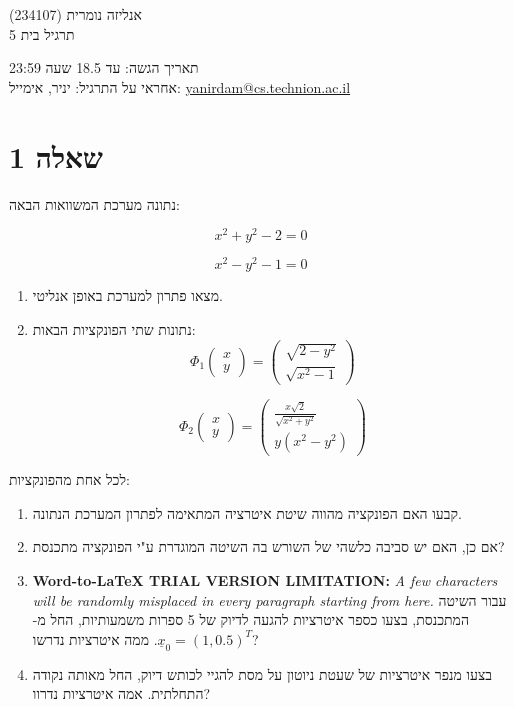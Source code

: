 \documentclass[10pt]{article}
\author{Yanir Damti}
\title{}
\begin{document}
\begin{center}
{\Huge אנליזה נומרית (234107)
\\
תרגיל בית 5}
\end{center}

\begin{center}
{\LARGE תאריך הגשה: עד 18.5 שעה 23:59
\\
אחראי על התרגיל: יניר, אימייל: \uline{yanirdam@cs.technion.ac.il}}
\end{center}

{\raggedleft
\section{שאלה 1}
}

{\raggedleft
{\large נתונה מערכת המשוואות הבאה:}
}


\[
x^2+y^2-2=0
\]



\[
x^2-y^2-1=0
\]


\begin{enumerate}
	\item {\large מצאו פתרון למערכת באופן אנליטי.}
	\item {\large נתונות שתי הפונקציות הבאות:
\\


\[
{\Phi{}}_1\left(\begin{array}{
cc}
x \\
y
\end{array}\right)=\left(\begin{array}{
cc}
\sqrt{2-y^2} \\
\sqrt{x^2-1}
\end{array}\right)
\]



\[
{\Phi{}}_2\left(\begin{array}{
cc}
x \\
y
\end{array}\right)=\left(\begin{array}{
cc}
\frac{x\sqrt{2}}{\sqrt{x^2+y^2}} \\
y\left(x^2-y^2\right)
\end{array}\right)
\]

}
\end{enumerate}

{\raggedleft
{\large לכל אחת מהפונקציות:}
}

\begin{enumerate}
	\item {\large קבעו האם הפונקציה מהווה שיטת איטרציה המתאימה לפתרון המערכת הנתונה.}
	\item {\large אם כן, האם יש סביבה כלשהי של השורש בה השיטה המוגדרת ע"י הפונקציה
מתכנסת?}
	\item 
\textbf{Word-to-LaTeX TRIAL VERSION LIMITATION:}\textit{ A few characters will be randomly misplaced in every paragraph starting from here.}
{\large עבור השיטה המתכנסת, בצעו כספר איטרציות להגעה לדיוק של 5 ספרות משמעותיות,
החל מ-${\underline{x}}_0={\left(1,0.5\right)}^T$.\textbf{ }ממה איטרציות נדרשו?}
	\item {\large בצעו מנפר איטרציות של שעטת ניוטון על מסת להגיי לכותש דיוק, החל מאותה
נקודה התחלתית. אמה איטרציות נדרוו?}
\end{enumerate}
\end{document}
